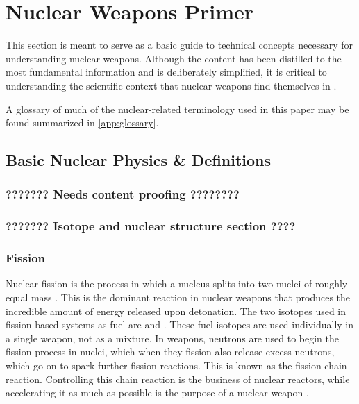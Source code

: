 \documentclass{report}
\begin{document}
\chapter{Nuclear Weapons Primer}


This section is meant to serve as a basic guide to technical concepts necessary for understanding nuclear weapons. Although the content has been distilled to the most fundamental information and is deliberately simplified, it is critical to understanding the scientific context that nuclear weapons find themselves in \cite{Prussin2014}. 


A glossary of much of the nuclear-related terminology used in this paper may be found summarized in  \autoref{app:glossary}.

\section{Basic Nuclear Physics \& Definitions}

\subsection{???????  Needs content proofing   ????????}

\subsection{??????? Isotope and nuclear structure section  ????}

\subsection{Fission}

Nuclear fission is the process in which a nucleus splits into two nuclei of roughly equal mass \cite{krane1987introductory,Lamarsh2013}. This is the dominant reaction in nuclear weapons that produces the incredible amount of energy released upon detonation. The two isotopes used in fission-based systems as fuel are  and . These fuel isotopes are used individually in a single weapon, not as a mixture. In weapons, neutrons are used to begin the fission process in nuclei, which when they fission also release excess neutrons, which go on to spark further fission reactions. This is known as the fission chain reaction. Controlling this chain reaction is the business of nuclear reactors, while accelerating it as much as possible is the purpose of a nuclear weapon \cite{Duderstadt1976}. 
\end{document}
